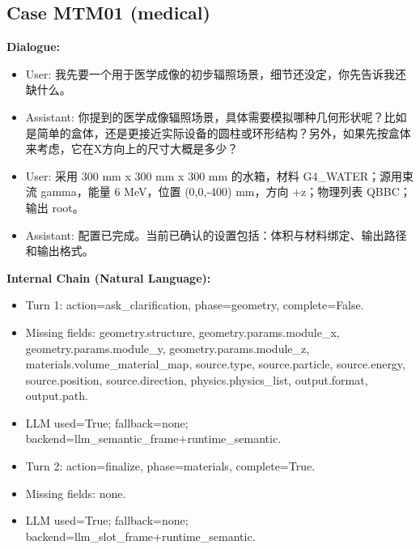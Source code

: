 \documentclass[11pt]{ctexart}
\begin{document}
\subsection{Case MTM01 (medical)}
\textbf{Dialogue:}
\begin{itemize}
\item User: 我先要一个用于医学成像的初步辐照场景，细节还没定，你先告诉我还缺什么。
\item Assistant: 你提到的医学成像辐照场景，具体需要模拟哪种几何形状呢？比如是简单的盒体，还是更接近实际设备的圆柱或环形结构？另外，如果先按盒体来考虑，它在X方向上的尺寸大概是多少？
\item User: 采用 300 mm x 300 mm x 300 mm 的水箱，材料 G4\_WATER；源用束流 gamma，能量 6 MeV，位置 (0,0,-400) mm，方向 +z；物理列表 QBBC；输出 root。
\item Assistant: 配置已完成。当前已确认的设置包括：体积与材料绑定、输出路径和输出格式。
\end{itemize}
\textbf{Internal Chain (Natural Language):}
\begin{itemize}
\item Turn 1: action=ask\_clarification, phase=geometry, complete=False.
\item Missing fields: geometry.structure, geometry.params.module\_x, geometry.params.module\_y, geometry.params.module\_z, materials.volume\_material\_map, source.type, source.particle, source.energy, source.position, source.direction, physics.physics\_list, output.format, output.path.
\item LLM used=True; fallback=none; backend=llm\_semantic\_frame+runtime\_semantic.
\item Turn 2: action=finalize, phase=materials, complete=True.
\item Missing fields: none.
\item LLM used=True; fallback=none; backend=llm\_slot\_frame+runtime\_semantic.
\end{itemize}
\end{document}
